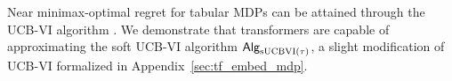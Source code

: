 Near minimax-optimal regret for tabular MDPs can be attained through the UCB-VI algorithm \citep{azar2017minimax}. We demonstrate that transformers are capable of approximating the soft UCB-VI algorithm ${\mathsf{Alg}}_{{\mathrm{sUCBVI}}(\tau)}$, a slight modification of UCB-VI formalized in Appendix~\ref{sec:tf_embed_mdp}. 



